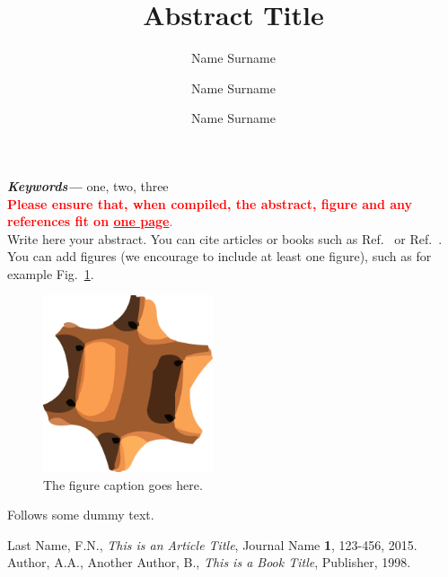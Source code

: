 \documentclass[a4paper]{article}
\providecommand{\keywords}[1]
{
  \small	
  \textbf{\textit{Keywords---}} #1
}
\begin{document}
 
\title{Abstract Title}

\author[1]{Name Surname}
\author[1,2]{Name Surname}
\author[2]{Name Surname}


\date{}
\maketitle\thispagestyle{fancy}
\vspace*{-0.75cm}


\keywords{one, two, three}\\ %


\textcolor{red}{\textbf{Please ensure that, when compiled, the abstract, figure and any references fit on  \underline{one page}}.}\\

Write here your abstract.
%
You can cite articles or books such as Ref.~\cite{ref1} or Ref.~\cite{ref2}.
%
You can add figures (we encourage to include at least one figure), such as for example Fig.~\ref{fig}. \\
%

\begin{figure}[h]
  \centering
  \includegraphics[width=5cm]{example.png}
  \caption{The figure caption goes here.}
  \label{fig}
\end{figure}

Follows some dummy text.
\lipsum[1-3]



\def\refname{\normalsize Bibliography}
\begin{thebibliography}{}
 \footnotesize %
  Last Name, F.N., \textit{This is an Article Title}, Journal Name \textbf{1}, 123-456, 2015.
  Author, A.A., Another Author, B., \textit{This is a Book Title}, Publisher, 1998.
\end{thebibliography}
\end{document}
